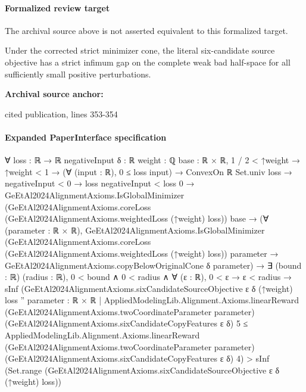 \documentclass[10pt]{article}
\begin{document}
\paragraph{Formalized review target}
The archival source above is not asserted equivalent to this formalized target.
\begin{ReviewVerbatim}
Under the corrected strict minimizer cone, the literal six-candidate source objective has a strict infimum gap on the complete weak bad half-space for all sufficiently small positive perturbations.
\end{ReviewVerbatim}

\textbf{Archival source anchor:} {\footnotesize\raggedright cited publication, lines 353-\allowbreak{}354\par}
\paragraph{Expanded PaperInterface specification}
\begin{ReviewVerbatim}
∀ {loss : ℝ → ℝ} {negativeInput δ : ℝ} {weight : ℚ} {base : ℝ × ℝ},
  1 / 2 < ↑weight →
    ↑weight < 1 →
      (∀ (input : ℝ), 0 ≤ loss input) →
        ConvexOn ℝ Set.univ loss →
          negativeInput < 0 →
            loss negativeInput < loss 0 →
              GeEtAl2024AlignmentAxioms.IsGlobalMinimizer
                  (GeEtAl2024AlignmentAxioms.coreLoss (GeEtAl2024AlignmentAxioms.weightedLoss (↑weight) loss)) base →
                (∀ (parameter : ℝ × ℝ),
                    GeEtAl2024AlignmentAxioms.IsGlobalMinimizer
                        (GeEtAl2024AlignmentAxioms.coreLoss (GeEtAl2024AlignmentAxioms.weightedLoss (↑weight) loss))
                        parameter →
                      GeEtAl2024AlignmentAxioms.copyBelowOriginalCone δ parameter) →
                  ∃ (bound : ℝ) (radius : ℝ),
                    0 < bound ∧
                      0 < radius ∧
                        ∀ (ε : ℝ),
                          0 < ε →
                            ε < radius →
                              sInf
                                  (GeEtAl2024AlignmentAxioms.sixCandidateSourceObjective ε δ (↑weight) loss ''
                                    {parameter : ℝ × ℝ |
                                      AppliedModelingLib.Alignment.Axioms.linearReward
                                          (GeEtAl2024AlignmentAxioms.twoCoordinateParameter parameter)
                                          (GeEtAl2024AlignmentAxioms.sixCandidateCopyFeatures ε δ) 5 ≤
                                        AppliedModelingLib.Alignment.Axioms.linearReward
                                          (GeEtAl2024AlignmentAxioms.twoCoordinateParameter parameter)
                                          (GeEtAl2024AlignmentAxioms.sixCandidateCopyFeatures ε δ) 4}) >
                                sInf
                                  (Set.range (GeEtAl2024AlignmentAxioms.sixCandidateSourceObjective ε δ (↑weight) loss))
\end{ReviewVerbatim}
\end{document}
